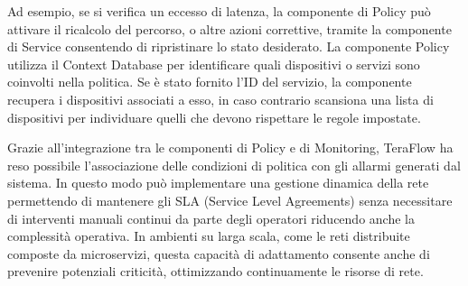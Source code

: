 Ad esempio, se si verifica un eccesso di latenza, la componente di Policy può attivare il ricalcolo del percorso, o altre azioni correttive, tramite la componente di Service
consentendo di ripristinare lo stato desiderato.
\newline La componente Policy utilizza il Context Database per identificare quali dispositivi o servizi sono coinvolti nella politica.
Se è stato fornito l'ID del servizio, la componente recupera i dispositivi associati a esso, in caso contrario scansiona una lista di dispositivi per individuare quelli che devono rispettare le regole impostate. 

Grazie all'integrazione tra le componenti di Policy e di Monitoring, TeraFlow ha reso possibile l'associazione delle condizioni di politica con gli allarmi generati dal sistema.
In questo modo può implementare una gestione dinamica della rete 
permettendo di mantenere gli SLA (Service Level Agreements) senza necessitare di interventi manuali continui da parte degli operatori riducendo anche la complessità operativa.
In ambienti su larga scala, come le reti distribuite composte da microservizi, questa capacità di adattamento consente anche di prevenire potenziali criticità, ottimizzando continuamente le risorse di rete.

